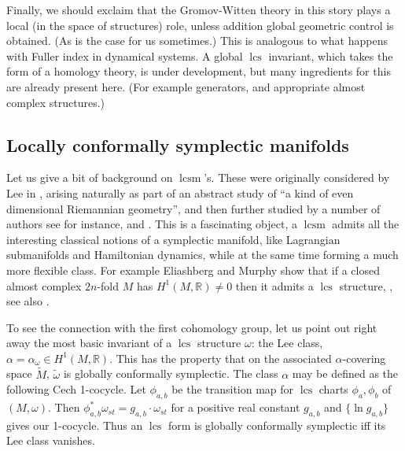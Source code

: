 \documentclass{amsart}
\numberwithin{equation}{section}
\theoremstyle{definition}
\theoremstyle{remark}
\DeclareMathOperator{\lcs}{lcs}
\DeclareMathOperator{\lcsm}{lcsm}
\begin{document}
Finally, we should exclaim that the Gromov-Witten theory in this story plays a local (in the space of structures) role, unless addition global geometric control is obtained. (As is the case for us sometimes.) This is analogous to what happens with Fuller index in dynamical systems. 
A global $\lcs$ invariant, which takes the form of a homology theory, is under development, but many ingredients for this are already present here. (For example generators, and appropriate almost complex structures.)
\subsection {Locally conformally symplectic manifolds}
Let us give a bit of background on $\lcsm$'s.
These were originally considered by Lee
in \cite{citeLee}, arising naturally as part of an abstract study of
``a kind of even dimensional Riemannian geometry'', and then further studied by
a number of authors see for instance, \cite{citeBanyagaConformal} and
\cite{citeVaismanConformal}.
This is a
fascinating object,  a $\lcsm$ admits all the interesting classical notions of
a symplectic manifold, like Lagrangian submanifolds and Hamiltonian
dynamics, while at the same time forming a much more
flexible class. For example Eliashberg and Murphy show that if a
closed almost complex $2n$-fold $M$ has $H ^{1} (M, \mathbb{R}) \neq 0
$ then it admits a $\lcs$ structure,
\cite{citeEliashbergMurphyMakingcobordisms}, see
also \cite{citeMurphyConformalsymp}.  

To see the connection with the first cohomology group, let us point out right away the most basic invariant of a $\lcs$ structure $\omega$:  the Lee class, $\alpha = \alpha _{\omega}  \in H ^{1} (M, \mathbb{R}) $. This has the property that on the associated $\alpha$-covering space $\widetilde{M} $, $\widetilde{\omega} $ is globally conformally symplectic. The class $\alpha$ may be defined as the following Cech 1-cocycle. 
Let $\phi _{a,b}$ be the transition map for $\lcs$ charts $\phi _{a}, \phi _{b}  $ of $(M, \omega)$. Then $\phi _{a,b} ^{*} \omega _{st} = g _{a,b} \cdot \omega _{st}  $ for a positive real constant $g _{a,b} $ and $\{\ln g _{a,b} \}$ gives our 1-cocycle. Thus an $\lcs$ form is globally conformally symplectic iff its Lee class vanishes.
\end{document}
